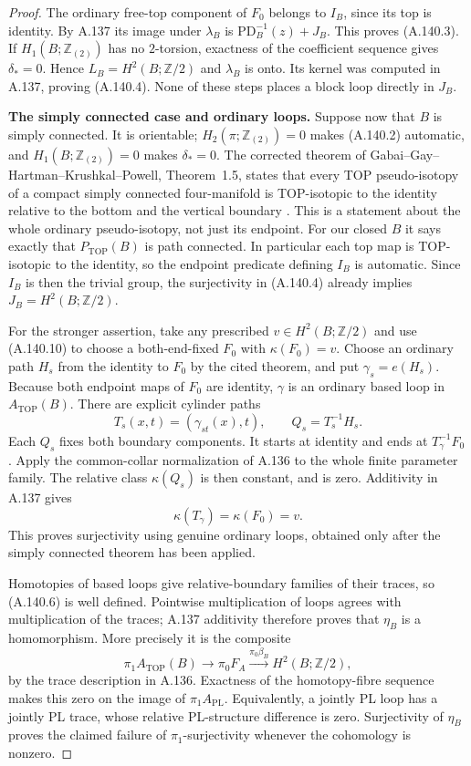 \begin{proof}
The ordinary free-top component of $F_0$ belongs to $I_B$,
since its top is identity. By A.137 its image under $\lambda_B$
is $\mathrm{PD}_B^{-1}(z)+J_B$. This proves (A.140.3).
If $H_1(B;\mathbb Z_{(2)})$ has no $2$-torsion, exactness of
the coefficient sequence gives $\delta_*=0$. Hence $L_B=H^2(B;
\mathbb Z/2)$ and $\lambda_B$ is onto. Its kernel was computed
in A.137, proving (A.140.4). None of these steps places a block
loop directly in $J_B$.

\textbf{The simply connected case and ordinary loops.}
Suppose now that $B$ is simply connected. It is orientable;
$H_2(\pi;\mathbb Z_{(2)})=0$ makes (A.140.2) automatic, and
$H_1(B;\mathbb Z_{(2)})=0$ makes $\delta_*=0$.
The corrected theorem of Gabai--Gay--Hartman--Krushkal--Powell,
Theorem~1.5, states that every TOP pseudo-isotopy of a compact
simply connected four-manifold is TOP-isotopic to the identity
relative to the bottom and the vertical boundary
\cite{GabaiGayHartmanKrushkalPowell2026}. This is a statement
about the whole ordinary pseudo-isotopy, not just its endpoint.
For our closed $B$ it says exactly that $P_{\mathrm{TOP}}(B)$
is path connected. In particular each top map is TOP-isotopic
to the identity, so the endpoint predicate defining $I_B$ is
automatic. Since $I_B$ is then the trivial group, the surjectivity
in (A.140.4) already implies $J_B=H^2(B;\mathbb Z/2)$.

For the stronger assertion, take any prescribed
$v\in H^2(B;\mathbb Z/2)$ and use (A.140.10) to choose a
both-end-fixed $F_0$ with $\kappa(F_0)=v$.
Choose an ordinary path $H_s$ from the identity to $F_0$ by
the cited theorem, and put $\gamma_s=e(H_s)$.
Because both endpoint maps of $F_0$ are identity, $\gamma$ is
an ordinary based loop in $A_{\mathrm{TOP}}(B)$.
There are explicit cylinder paths
\[
 T_s(x,t)=(\gamma_{st}(x),t),
 \qquad Q_s=T_s^{-1}H_s.                               \tag{A.140.11}
\]
Each $Q_s$ fixes both boundary components. It starts at identity
and ends at $T_\gamma^{-1}F_0$. Apply the common-collar
normalization of A.136 to the whole finite parameter family.
The relative class $\kappa(Q_s)$ is then constant, and is zero.
Additivity in A.137 gives
\[
                 \kappa(T_\gamma)=\kappa(F_0)=v.       \tag{A.140.12}
\]
This proves surjectivity using genuine ordinary loops, obtained
only after the simply connected theorem has been applied.

Homotopies of based loops give relative-boundary families of their
traces, so (A.140.6) is well defined. Pointwise multiplication of
loops agrees with multiplication of the traces; A.137 additivity
therefore proves that $\eta_B$ is a homomorphism. More precisely
it is the composite
\[
 \pi_1A_{\mathrm{TOP}}(B)\longrightarrow\pi_0F_A
       \xrightarrow{\pi_0\beta_B}H^2(B;\mathbb Z/2),  \tag{A.140.13}
\]
by the trace description in A.136. Exactness of the homotopy-fibre
sequence makes this zero on the image of $\pi_1A_{\mathrm{PL}}$.
Equivalently, a jointly PL loop has a jointly PL trace, whose
relative PL-structure difference is zero. Surjectivity of
$\eta_B$ proves the claimed failure of $\pi_1$-surjectivity
whenever the cohomology is nonzero.


\end{proof}

